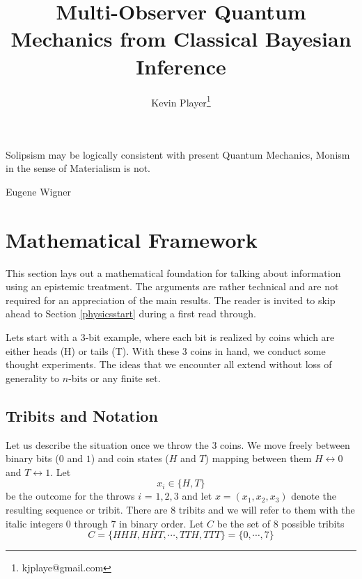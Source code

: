 \documentclass[12pt,a4paper]{article}
\theoremstyle{myrule}
\theoremstyle{postulate}
\theoremstyle{definition}
\begin{document}
\title{Multi-Observer Quantum Mechanics from Classical Bayesian Inference}
\author[1]{Kevin Player\footnote{kjplaye@gmail.com}}

\maketitle


\epigraph{Solipsism may be logically consistent with present Quantum Mechanics, Monism in the sense of Materialism is not.}{Eugene Wigner}


\section{Mathematical Framework}
This section lays out a mathematical foundation for talking about information using an epistemic treatment. The arguments are rather technical and are not required for an appreciation of the main results.  The reader is invited to skip ahead to Section \ref{physicsstart} during a first read through.

Lets start with a 3-bit example, where each bit is realized by coins which are either heads (H) or tails (T).  With these 3 coins in hand, we conduct some thought experiments.  The ideas that we encounter all extend without loss of generality to $n$-bits or any finite set.

\subsection{Tribits and Notation}
Let us describe the situation once we throw the 3 coins.  We move freely between binary bits ($0$ and $1$) and coin states ($H$ and $T$) mapping between them $H \leftrightarrow 0$ and $T \leftrightarrow 1$. Let
\[
x_i \in \{H,T\}
\]
be the outcome for the throws $i$ = $1,2,3$ and let $x = (x_1, x_2, x_3)$ denote the resulting sequence or tribit.  There are 8 tribits and we will refer to them with the italic integers $\mathit{0}$ through $\mathit{7}$ in binary order.  Let $C$ be the set of 8 possible tribits
\[
 C = \{HHH,HHT,\cdots,TTH, TTT\} = \{\mathit{0},\cdots,\mathit{7}\}
\]
  
\end{document}
